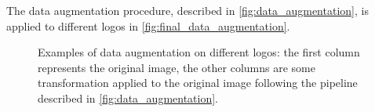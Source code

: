 The data augmentation procedure, described in \autoref{fig:data_augmentation}, is applied to different logos in \autoref{fig:final_data_augmentation}.

\begin{figure}%
	\centering
	\hfill
	\hfill
	\hfill
	\hfill
	\hfill
	\caption{Examples of data augmentation on different logos: the first column represents the original image, the other columns are some transformation applied to the original image following the pipeline described in \autoref{fig:data_augmentation}.}%
	\label{fig:final_data_augmentation}%
\end{figure}

